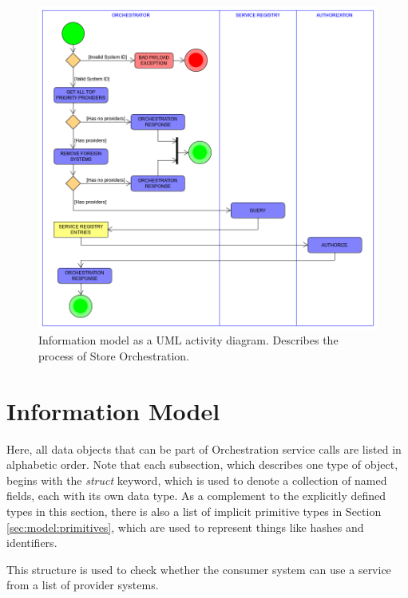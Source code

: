 \documentclass[a4paper]{arrowhead}
\begin{document}
\begin{figure}
  \centering
  \includegraphics[width=\textwidth,height=\textheight,keepaspectratio]{figures/post_store_orchestration_activity_uml.png}
  \caption{
    Information model as a UML activity diagram. Describes the process of Store Orchestration.
  }
  \label{fig:query_overview}
\end{figure}

\section{Information Model}
\label{sec:model}

Here, all data objects that can be part of Orchestration service calls are listed in alphabetic order.
Note that each subsection, which describes one type of object, begins with the \textit{struct} keyword, which is used to denote a collection of named fields, each with its own data type.
As a complement to the explicitly defined types in this section, there is also a list of implicit primitive types in Section \ref{sec:model:primitives}, which are used to represent things like hashes and identifiers.


This structure is used to check whether the consumer system can use a service from a list of provider systems.
\end{document}
